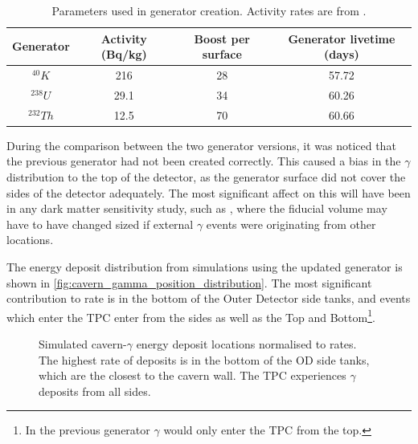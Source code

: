 \begin{table}
    \centering
    \begin{tabular}{c|c|c|c}
        Generator    & Activity (Bq/kg) & Boost per surface & Generator livetime (days)  \\ \hline
        ${}^{40}K$   & 216              & 28                & 57.72                      \\
        ${}^{238}U$  & 29.1             & 34                & 60.26                      \\
        ${}^{232}Th$ & 12.5             & 70                & 60.66
    \end{tabular}
    \caption{Parameters used in generator creation. Activity rates are from \cite{LZ_Gamma_Ray_Background_ref}.}
    \label{tab:cavern_gamma_generator_parameters}
\end{table}





\par
During the comparison between the two generator versions, it was noticed that the previous generator had not been created correctly.
This caused a bias in the $\gamma$ distribution to the top of the detector, as the generator surface did not cover the sides of the detector adequately.
The most significant affect on this will have been in any dark matter sensitivity study, such as \cite{lz_simulations_ref}, where the fiducial volume may have to have changed sized if external $\gamma$ events were originating from other locations.
\par
The energy deposit distribution from simulations using the updated generator is shown in \autoref{fig:cavern_gamma_position_distribution}.
The most significant contribution to rate is in the bottom of the Outer Detector side tanks, and events which enter the TPC enter from the sides as well as the Top and Bottom\footnote{In the previous generator $\gamma$ would only enter the TPC from the top.}.

\begin{figure}
    \centering
    \resizebox{\textwidth}{!}{

}
    \caption[Simulated cavern-$\gamma$ energy deposit locations normalised to rates.]{Simulated cavern-$\gamma$ energy deposit locations normalised to rates.
             The highest rate of deposits is in the bottom of the OD side tanks, which are the closest to the cavern wall.
             The TPC experiences $\gamma$ deposits from all sides.}
    \label{fig:cavern_gamma_position_distribution}
\end{figure}